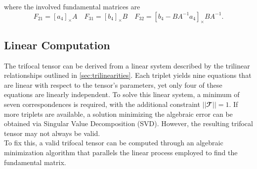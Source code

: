 where the involved fundamental matrices are
\begin{equation}
	F_{21} = [a_4]_{\times}A \quad F_{31} = [b_4]_{\times}B \quad F_{32} = [b_4 - BA^{-1}a_4]_{\times}BA^{-1}.
\end{equation}

\subsection{Linear Computation}
The trifocal tensor can be derived from a linear system described by the trilinear relationships outlined in \ref{sec:trilinearities}. Each triplet yields nine equations that are linear with respect to the tensor's parameters, yet only four of these equations are linearly independent. To solve this linear system, a minimum of seven correspondences is required, with the additional constraint \( || \mathbfcal{T} || = 1 \). If more triplets are available, a solution minimizing the algebraic error can be obtained via Singular Value Decomposition (SVD). However, the resulting trifocal tensor may not always be valid.\\

To fix this, a valid trifocal tensor can be computed through an algebraic minimization algorithm that parallels the linear process employed to find the fundamental matrix.

